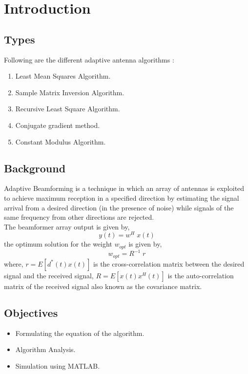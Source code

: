 \pagestyle{fancy}
\fancyhf{}
\rfoot{\thepage}


\chapter{Introduction}


\section{Types}
Following are the different adaptive antenna algorithms \cite{ADR1}:
\begin{enumerate}
\item Least Mean Squares Algorithm. 
\item Sample Matrix Inversion Algorithm.
\item Recursive Least Square Algorithm.
\item Conjugate gradient method.
\item Constant Modulus Algorithm.
\end{enumerate}

\section{Background}

Adaptive Beamforming is a technique in which an array of antennas is exploited to achieve maximum reception in a specified direction by estimating the signal arrival from a desired direction (in the presence of noise) while signals of the same frequency from other directions are rejected.\\
The beamformer array output is given by, 
\begin{equation*}
y(t)= w^{H}\;x(t)
\end{equation*}
the optimum solution for the weight $w_{opt}$ is given by,\\
\begin{equation*}
w_{opt} = R^{-1}\;r
\end{equation*}
where,\; $r = E{[d^*(t)x(t)]}$ is the cross-correlation matrix between the desired signal
and the received signal,\; $R = E[x(t)x^{H}(t)]$ is the auto-correlation matrix of the received signal also known as the covariance matrix.


\section{Objectives}
\begin{itemize}
  \item Formulating the equation of the algorithm.
  \item Algorithm Analysis.
  \item Simulation using MATLAB.
\end{itemize}

